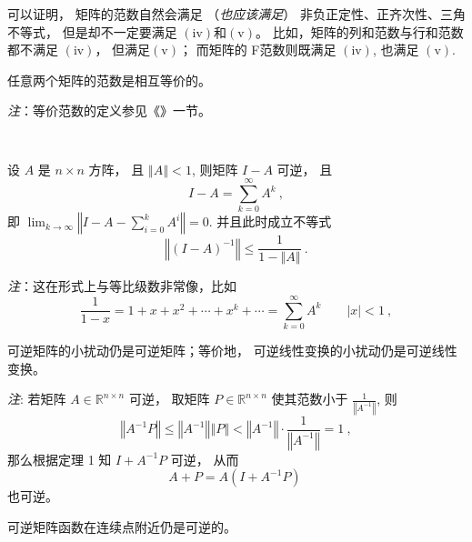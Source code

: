  可以证明， 矩阵的范数自然会满足 （\textsl{也应该满足}） 非负正定性、正齐次性、三角不等式， 但是却不一定要满足 $(\mathrm{iv})$和$(\mathrm{v})$。 比如，矩阵的列和范数与行和范数都不满足 $(\mathrm{iv})$， 但满足$(\mathrm{v})$； 而矩阵的 F范数则既满足 $(\mathrm{iv})$, 也满足 $(\mathrm{v})$. 



\begin{theorem}{}
任意两个矩阵的范数是相互等价的。 

\textsl{注}：等价范数的定义参见《》一节。
\end{theorem}
\verb| |

\begin{theorem}{}
设 $A$ 是 $n\times n$ 方阵， 且 $\left\Vert A\right\Vert <1$, 则矩阵 $I-A$
可逆， 且 
\[
I-A=\sum_{k=0}^{\infty}A^{k}~,
\]
即 ${\displaystyle \lim_{k\rightarrow\infty}}\left\Vert I-A-{\displaystyle \sum_{i=0}^{k}A^{i}}\right\Vert =0.$
并且此时成立不等式
\[
\left\Vert (I-A)^{-1}\right\Vert \leqslant{\displaystyle \frac{1}{1-\left\Vert A\right\Vert }~.}
\]
\end{theorem}
\textsl{注}：这在形式上与等比级数非常像，比如
\[
{\displaystyle \frac{1}{1-x}=1+x+x^{2}+\cdots+x^{k}+\cdots=\sum_{k=0}^{\infty}A^{k}\quad\quad|x|<1}~,\]


\begin{corollary}{}
可逆矩阵的小扰动仍是可逆矩阵；等价地， 可逆线性变换的小扰动仍是可逆线性变换。
\end{corollary}

\textsl{注}: 若矩阵 $A\in\mathbb{R}^{n\times n}$ 可逆， 取矩阵 $P\in\mathbb{R}^{n\times n}$
使其范数小于 $\frac{1}{\left\Vert A^{-1}\right\Vert }$, 则
\[
\left\Vert A^{-1}P\right\Vert \leqslant\left\Vert A^{-1}\right\Vert \left\Vert P\right\Vert <\left\Vert A^{-1}\right\Vert \cdot{\displaystyle \frac{1}{\left\Vert A^{-1}\right\Vert }=1~,}
\]
那么根据定理 1 知 $I+A^{-1}P$ 可逆， 从而
\[
A+P=A(I+A^{-1}P)~
\]
也可逆。 

\begin{corollary}{}
可逆矩阵函数在连续点附近仍是可逆的。
\end{corollary} 
